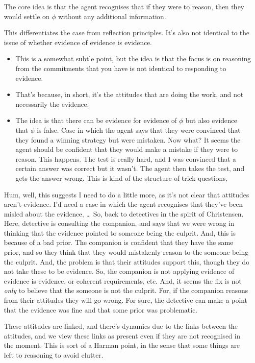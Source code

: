 \documentclass[10pt]{article}
\begin{document}
The core idea is that the agent recognises that if they were to reason, then they would settle on \(\phi\) without any additional information.

This differentiates the case from reflection principles.
It's also not identical to the issue of whether evidence of evidence is evidence.
\begin{itemize}
\item This is a somewhat subtle point, but the idea is that the focus is on reasoning from the commitments that you have is not identical to responding to evidence.
\item That's because, in short, it's the attitudes that are doing the work, and not necessarily the evidence.
\item The idea is that there can be evidence for evidence of \(\phi\) but also evidence that \(\phi\) is false.
  Case in which the agent says that they were convinced that they found a winning strategy but were mistaken.
  Now what?
  It seems the agent should be confident that they would make a mistake if they were to reason.
  This happens.
  The test is really hard, and I was convinced that a certain answer was correct but it wasn't.
  The agent then takes the test, and gets the answer wrong.
  This is kind of the structure of trick questions, 
\end{itemize}
Hum, well, this suggests I need to do a little more, as it's not clear that attitudes aren't evidence.
I'd need a case in which the agent recognises that they've been misled about the evidence, \dots
So, back to detectives in the spirit of Christensen.
Here, detective is consulting the companion, and says that we were wrong in thinking that the evidence pointed to someone being the culprit.
And, this is because of a bad prior.
The companion is confident that they have the same prior, and so they think that they would mistakenly reason to the someone being the culprit.
And, the problem is that their attitudes support this, though they do not take these to be evidence.
So, the companion is not applying evidence of evidence is evidence, or coherent requirements, etc.
And, it seems the fix is not \emph{only} to believe that the someone is not the culprit.
For, if the companion reasons from their attitudes they will go wrong.
For sure, the detective can make a point that the evidence was fine and that some prior was problematic.

These attitudes are linked, and there's dynamics due to the links between the attitudes, and we view these links as present even if they are not recognised in the moment.
This is sort of a Harman point, in the sense that some things are left to reasoning to avoid clutter.
\end{document}
